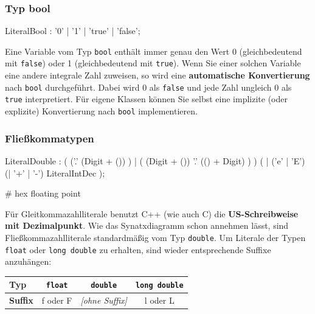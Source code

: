 \documentclass[a4paper]{report}
\begin{document}
\subsubsection{Typ bool}

\begin{multicols}{2}
	\begin{rail}
		LiteralBool : '0' | '1' | 'true' | 'false';
	\end{rail}

Eine Variable vom Typ \texttt{bool} enthält immer genau den Wert 0 (gleichbedeutend mit \texttt{false}) oder 1 (gleichbedeutend mit \texttt{true}). Wenn Sie einer solchen Variable eine andere integrale Zahl zuweisen, so wird eine \textbf{automatische Konvertierung} nach \texttt{bool} durchgeführt. Dabei wird 0 als \texttt{false} und jede Zahl ungleich 0 als \texttt{true} interpretiert. Für eigene Klassen können Sie selbst eine implizite (oder explizite) Konvertierung nach \texttt{bool} implementieren. %
\end{multicols}

\subsubsection{Fließkommatypen}

	
\begin{rail}
	LiteralDouble : (
						('.' 
							(Digit + ())
						) |
						(
							(Digit + ())
							'.' (() + Digit)
						)
					) %
					( | 
						('e' | 'E') 
						(| '+' | '-') 
						LiteralIntDec
					);
\end{rail}

\# hex floating point

Für Gleitkommazahlliterale benutzt C++ (wie auch C) die \textbf{US-Schreibweise mit Dezimalpunkt}. Wie das Synatxdiagramm schon annehmen lässt, sind Fließkommazahlliterale standardmäßig vom Typ \texttt{double}. Um Literale der Typen \texttt{float} oder \texttt{long double} zu erhalten, sind wieder entsprechende Suffixe anzuhängen:
\begin{center}
\begin{tabular}{|l|c|c|c|} \hline
	\textbf{Typ} & \texttt{float} & \texttt{double} & \texttt{long double} \\ \hline
	\textbf{Suffix} & f oder F & \textit{[ohne Suffix]} & l oder L \\ \hline
\end{tabular}
\end{center}
\end{document}
